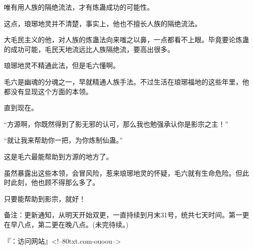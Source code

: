 \begin{this_body}
唯有用人族的隔绝流法，才有炼蛊成功的可能性。

这点，琅琊地灵并不清楚，事实上，他也不擅长人族的隔绝流法。

大毛民主义的他，对人族的炼蛊法向来嗤之以鼻，一点都看不上眼。毕竟要论炼蛊的成功可能，毛民天地流远比人族隔绝流，要高出很多。

琅琊地灵不精通此法，但是毛六懂啊。

毛六是幽魂的分魂之一，早就精通人族手法。不过生活在琅琊福地的这些年里，他都没有显现这个方面的本领。

直到现在。

“方源啊，你既然得到了影无邪的认可，那么我也勉强承认你是影宗之主！”

“就让我来帮助你一把，为你炼制仙蛊。”

这是毛六最能帮助到方源的地方了。

虽然暴露出这些本领，会冒风险，惹来琅琊地灵的怀疑，毛六就有生命危险。但此时此刻，他也顾不得那么多了。

只要能帮助到影宗，就好！

备注：更新通知，从明天开始双更，一直持续到月末31号，统共七天时间。第一更在早八点，第二更在晚八点。(未完待续。)

『：访问网站』<!--80txt.com-ouoou-->

\end{this_body}

